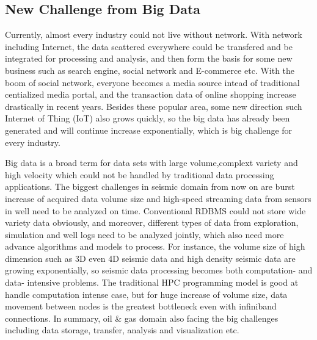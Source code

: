 \subsection{New Challenge from Big Data}
Currently, almost every industry could not live without network. With network including Internet, the data scattered everywhere could be transfered and be integrated for processing and analysis, and then form the basis for some new business such as search engine, social network and E-commerce etc. With the boom of social network, everyone becomes a media source intead of traditional centialized media portal, and the transaction data of online shopping increase drastically in recent years. Besides these popular area, some new direction such Internet of Thing (IoT) also grows quickly, so the big data has already been generated and will continue increase exponentially, which is big challenge for every industry.    

Big data \cite{WikiBigData} is a broad term for data sets with large volume,complext variety and high velocity which could not be handled by traditional data processing applications. The biggest challenges in seismic domain from now on are burst increase of acquired data volume size and high-speed streaming data from sensors in well need to be analyzed on time. Conventional RDBMS could not store wide variety data obviously, and moreover, different types of data from exploration, simulation and well logs need to be analyzed jointly, which also need more advance algorithms and models to process. For instance, the volume size of high dimension such as 3D even 4D seismic data and high density seismic data are growing exponentially, so seismic data processing becomes both computation- and data- intensive problems. The traditional HPC programming model is good at handle computation intense case, but for huge increase of volume size, data movement between nodes is the greatest bottleneck even with infiniband connections. In summary, oil \& gas domain also facing the big challenges including data storage, transfer, analysis and visualization etc.

